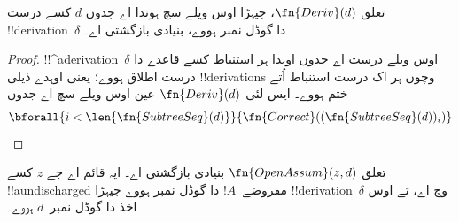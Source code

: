 \documentclass[../../../include/open-logic-section]{subfiles}
\begin{document}
\begin{prop}
  تعلق $\fn{Deriv}(d)$،
  جیہڑا اوس ویلے سچ
  ہوندا اے جدوں $d$
  کسے درست
  !!{derivation}~$\delta$
  دا گوڈل نمبر ہووے،
  بنیادی بازگشتی اے۔
\end{prop}

\begin{proof}
  !!^a{derivation}~$\delta$
  اوس ویلے درست اے جدوں
  اوہدا ہر استنباط کسے
  قاعدے دا درست اطلاق
  ہووے؛ یعنی اوہدے ذیلی
  !!{derivation}s وچوں
  ہر اک درست استنباط
  اُتے ختم ہووے۔ ایس
  لئی $\fn{Deriv}(d)$
  عین اوس ویلے سچ
  اے جدوں
  \[
  \bforall{i<\len{\fn{SubtreeSeq}(d)}}{\fn{Correct}((\fn{SubtreeSeq}(d))_i)}
  \]
\end{proof}

\begin{prop}
  تعلق $\fn{OpenAssum}(z, d)$ بنیادی بازگشتی اے۔ ایہ قائم اے جے
$z$ کسے !!a{undischarged} مفروضے~$!A$ دا گوڈل نمبر ہووے جیہڑا
!!{derivation}~$\delta$ وچ اے، تے اوس اخذ دا گوڈل نمبر~$d$ ہووے۔
\end{prop}
\end{document}
